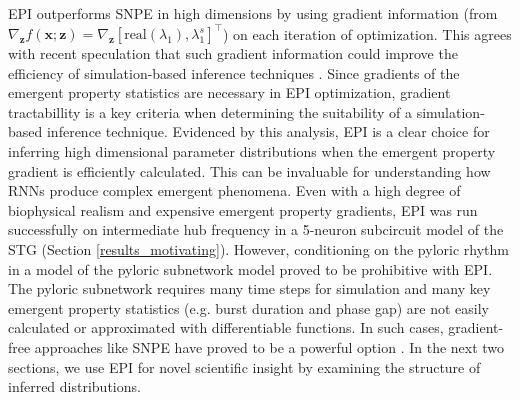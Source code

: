 \documentclass[11pt]{article}
\begin{document}
EPI outperforms SNPE in high dimensions by using gradient information (from $\nabla_\mathbf{z} f(\mathbf{x}; \mathbf{z}) = \nabla_\mathbf{z} [\text{real}(\lambda_1), \lambda_1^s]^\top$) on each iteration of optimization.
This agrees with recent speculation that such gradient information could improve the efficiency of simulation-based inference techniques \cite{cranmer2020frontier}.
Since gradients of the emergent property statistics are necessary in EPI optimization, gradient tractabillity is a key criteria when determining the suitability of a simulation-based inference technique.
Evidenced by this analysis, EPI is a clear choice for inferring high dimensional parameter distributions when the emergent property gradient is efficiently calculated.
This can be invaluable for understanding how RNNs produce complex emergent phenomena.
Even with a high degree of biophysical realism and expensive emergent property gradients, EPI was run successfully on intermediate hub frequency in a 5-neuron subcircuit model of the STG (Section \ref{results_motivating}).
However, conditioning on the pyloric rhythm \cite{marder1992dynamic} in a model of the pyloric subnetwork model \cite{prinz2004similar} proved to be prohibitive with EPI.
The pyloric subnetwork requires many time steps for simulation and many key emergent property statistics (e.g. burst duration and phase gap) are not easily calculated or approximated with differentiable functions.
In such cases, gradient-free approaches like SNPE have proved to be a powerful option \cite{gonccalves2019training}.
In the next two sections, we use EPI for novel scientific insight by examining the structure of inferred distributions.
\end{document}
